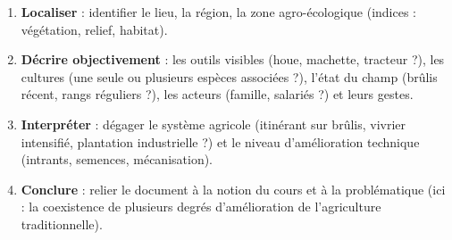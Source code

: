 \documentclass[11pt]{article}
\begin{document}
\begin{methode}
\begin{enumerate}
\item \textbf{Localiser} : identifier le lieu, la région, la zone agro-écologique (indices : végétation, relief, habitat).
\item \textbf{Décrire objectivement} : les outils visibles (houe, machette, tracteur ?), les cultures (une seule ou plusieurs espèces associées ?), l'état du champ (brûlis récent, rangs réguliers ?), les acteurs (famille, salariés ?) et leurs gestes.
\item \textbf{Interpréter} : dégager le système agricole (itinérant sur brûlis, vivrier intensifié, plantation industrielle ?) et le niveau d'amélioration technique (intrants, semences, mécanisation).
\item \textbf{Conclure} : relier le document à la notion du cours et à la problématique (ici : la coexistence de plusieurs degrés d'amélioration de l'agriculture traditionnelle).
\end{enumerate}
\end{methode}
\end{document}
